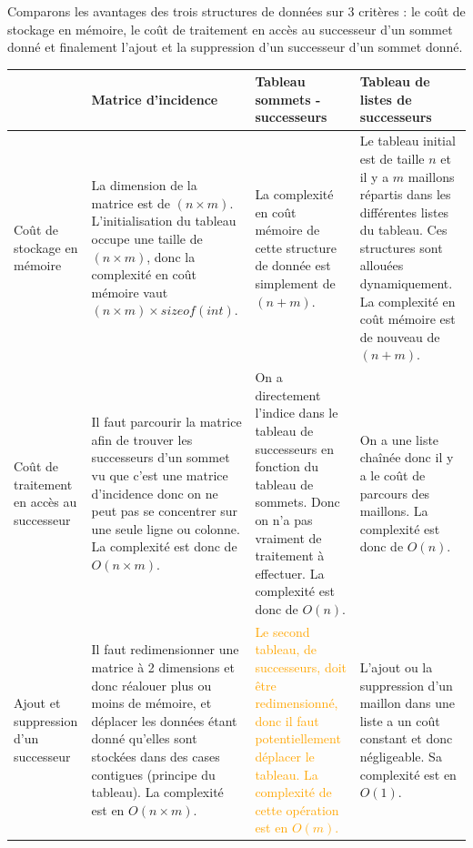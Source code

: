 \documentclass[11pt, a4paper]{report}
\begin{document}
    Comparons les avantages des trois structures de données sur 3 critères : le coût de stockage en mémoire, le coût de traitement en accès au successeur d'un sommet donné et finalement l'ajout et la suppression d'un successeur d'un sommet donné.

    \begin{center}
        \begin{tabular}{ | p{} | p{} | p{} | p{} | }
            \hline
            	 &
            	Matrice d'incidence &
            	Tableau sommets - successeurs &
            	Tableau de listes de successeurs \\
            \hline
            	Coût de stockage en mémoire &
            	\textcolor{BrickRed}{La dimension de la matrice est de $(n \times m)$. L'initialisation du tableau occupe une taille de $(n \times m)$, donc la complexité en coût mémoire vaut $(n \times m) \times sizeof(int)$.} &
            	\textcolor{OliveGreen}{La complexité en coût mémoire de cette structure de donnée est simplement de $(n+m)$.} &
	            \textcolor{OliveGreen}{Le tableau initial est de taille $n$ et il y a $m$ maillons répartis dans les différentes listes du tableau. Ces structures sont allouées dynamiquement. La complexité en coût mémoire est de nouveau de $(n + m)$.}\\
            \hline
            	Coût de traitement en accès au successeur &
            	\textcolor{BrickRed}{Il faut parcourir la matrice afin de trouver les successeurs d'un sommet vu que c'est une matrice d'incidence donc on ne peut pas se concentrer sur une seule ligne ou colonne. La complexité est donc de\hspace{1cm} $O(n \times m)$.} &
            	\textcolor{OliveGreen}{On a directement l'indice dans le tableau de successeurs en fonction du tableau de sommets. Donc on n'a pas vraiment de traitement à effectuer. La complexité est donc de $O(n)$.} &
            	\textcolor{OliveGreen}{On a une liste chaînée donc il y a le coût de parcours des maillons. La complexité est donc de $O(n)$.}\\
            \hline
            	Ajout et suppression d'un successeur &
            	\textcolor{BrickRed}{Il faut redimensionner une matrice à 2 dimensions et donc réalouer plus ou moins de mémoire, et déplacer les données étant donné qu'elles sont stockées dans des cases contigues (principe du tableau). La complexité est en $O(n \times m)$.} &
            	\textcolor{Orange}{Le second tableau, de successeurs, doit être redimensionné, donc il faut potentiellement déplacer le tableau. La complexité de cette opération est en $O(m)$.} &
            	\textcolor{OliveGreen}{L'ajout ou la suppression d'un maillon dans une liste a un coût constant et donc négligeable. Sa complexité est en $O(1)$.}\\
            \hline
        \end{tabular}
    \end{center}
\end{document}
